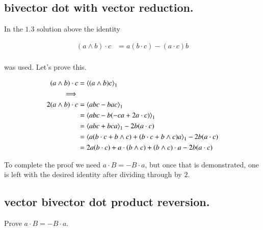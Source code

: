 \documentclass{article}
\begin{document}
\subsection{ bivector dot with vector reduction. }

In the $1.3$ solution above the identity

\begin{align}
(a \wedge b) \cdot c &= a (b \cdot c) - (a \cdot c) b \\
\end{align}

was used.  Let's prove this.

\begin{align*}
(a \wedge b) \cdot c
&= {\left\langle{{(a \wedge b) c}}\right\rangle}_{1} \\
\implies \\
2 (a \wedge b) \cdot c
&= {\left\langle{{a b c - b a c}}\right\rangle}_{1} \\
&= {\left\langle{{a b c - b (- c a + 2 a \cdot c )}}\right\rangle}_{1} \\
&= {\left\langle{{a b c + b c a}}\right\rangle}_{1} - 2 b (a \cdot c ) \\
&= {\left\langle{{a (b \cdot c + b \wedge c) + (b \cdot c + b \wedge c) a}}\right\rangle}_{1} - 2 b (a \cdot c ) \\
&= 2 a (b \cdot c) + a \cdot (b \wedge c) + (b \wedge c) \cdot a - 2 b (a \cdot c ) \\
\end{align*}

To complete the proof we need $a \cdot B = -B \cdot a$, but once that is demonstrated, one is left with the desired identity after dividing through
by $2$.

\subsection{ vector bivector dot product reversion. }

Prove $a \cdot B = -B \cdot a$.



\end{document}
